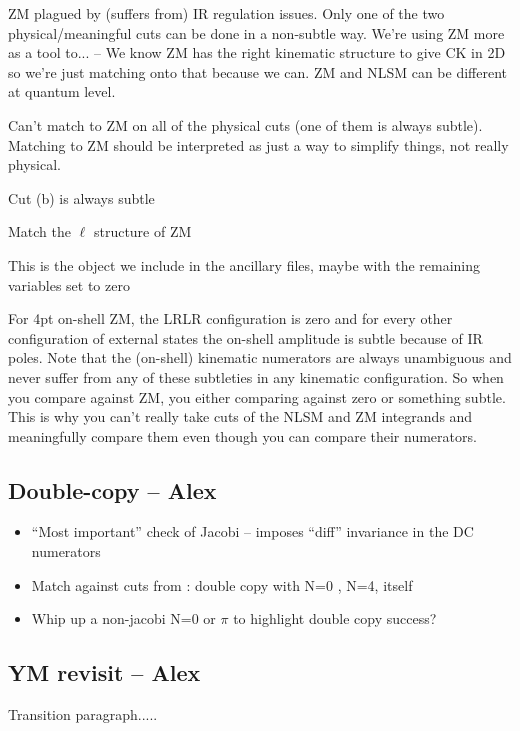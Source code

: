 \documentclass[11pt,letter]{article}
\begin{document}
ZM plagued by (suffers from) IR regulation issues.
Only one of the two physical/meaningful cuts can be done in a non-subtle way.
We're using ZM more as a tool to... -- We know ZM has the right kinematic structure to give CK in 2D so we're just matching onto that because we can.  ZM and NLSM can be different at quantum level.

Can't match to ZM on all of the physical cuts (one of them is always subtle).  Matching to ZM should be interpreted as just a way to simplify things, not really physical.

Cut (b) is always subtle

Match the $\ell$ structure of ZM

This is the object we include in the ancillary files, maybe with the remaining variables set to zero

For 4pt on-shell ZM, the LRLR configuration is zero and for every other configuration of external states the on-shell amplitude is subtle because of IR poles.  Note that the (on-shell) kinematic numerators are always unambiguous and never suffer from any of these subtleties in any kinematic configuration.  So when you compare against ZM, you either comparing against zero or something subtle.  This is why you can't really take cuts of the NLSM and ZM integrands and meaningfully compare them even though you can compare their numerators.

\subsection{Double-copy -- Alex }

\begin{itemize}
\item  ``Most important'' check of Jacobi -- imposes ``diff'' invariance in the DC numerators
\item Match against cuts from \cite{Carrasco:2023qgz}: double copy
  with N=0 \cite{Bern:2015ooa}, N=4, itself
  \item Whip up a non-jacobi N=0 or $\pi$ to highlight double copy success?
\end{itemize}

\subsection{YM revisit -- Alex}
Transition paragraph.....
\end{document}
